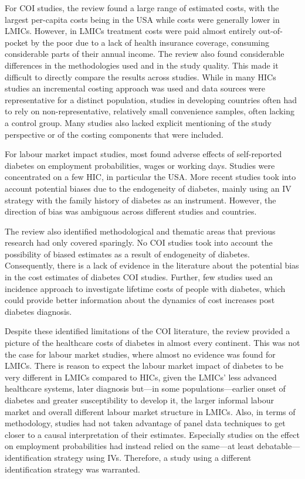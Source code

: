 For \ac{COI} studies, the review found a large range of estimated costs, with the largest per-capita costs being \DIFdelbegin {}\DIFdelend \DIFaddbegin {}\DIFaddend in the USA while costs were generally lower in \acp{LMIC}. However, in \acp{LMIC} treatment costs were paid almost entirely out-of-pocket by the poor due to a lack of health insurance coverage, consuming considerable parts of their annual income.  The review also found considerable differences in the methodologies used and in the study quality. This made it difficult to directly compare the results across studies. While in many \acp{HIC} studies an incremental costing approach was used and data sources were representative for a distinct population, studies in developing countries often had to rely on non-representative, relatively small convenience samples, often lacking a control group. Many studies also lacked explicit mentioning of the study perspective or of the costing components that were included. 

For labour market impact studies, most found adverse effects of self-reported diabetes on employment probabilities, wages or working days. Studies were concentrated on a few \ac{HIC}, in particular the USA. More recent studies took into account potential biases due to the endogeneity of diabetes, mainly using an \ac{IV} strategy with the family history of diabetes as an instrument. However, the direction of bias was ambiguous across different studies and countries. 

The review also identified methodological and thematic areas that previous research had only covered sparingly. No \ac{COI} studies took into account the possibility of biased estimates as a result of endogeneity of diabetes. Consequently, there is a lack of evidence in the literature about the potential bias in the cost estimates of diabetes \ac{COI} studies. Further, few studies used an incidence approach to investigate lifetime costs of people with diabetes, which could provide better information about the dynamics of cost increases post diabetes diagnosis. 

Despite these identified limitations of the \ac{COI} literature, the review provided a picture of the healthcare costs of diabetes in almost every continent. This was not the case for labour market studies, where almost no evidence was found for \acp{LMIC}. There is reason to expect the labour market impact of diabetes to be very different in \acp{LMIC} compared to \acp{HIC}, given the \acp{LMIC}' less advanced healthcare systems, later diagnosis but---in some populations---earlier onset of diabetes and greater susceptibility to develop it, the larger informal labour market and overall different labour market structure in \acp{LMIC}. Also, in terms of methodology, studies had not taken advantage of panel data techniques to get closer to a causal interpretation of their estimates. Especially studies on the effect on employment probabilities had instead relied on the same---at least debatable---identification strategy using \acp{IV}. Therefore, a study using a different identification strategy was warranted.

